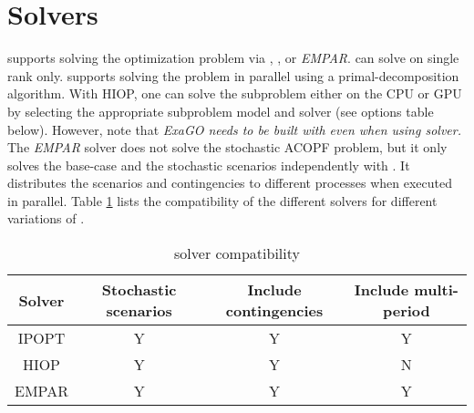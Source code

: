 \section{Solvers}
\sopflow supports solving the optimization problem via \ipopt, \hiop, or \emph{EMPAR}. \ipopt can solve \sopflow on single rank only. \hiop supports solving the problem in parallel using a primal-decomposition algorithm. With HIOP, one can solve the subproblem either on the CPU or GPU by selecting the appropriate subproblem model and solver (see options table below). However, note that \emph{ExaGO needs to be built with \ipopt even when using \hiop solver.} The \emph{EMPAR} solver does not solve the stochastic ACOPF problem, but it only solves the base-case and the stochastic scenarios independently with \opflow. It distributes the scenarios and contingencies to different processes when executed in parallel. Table \ref{tab:sopflow_solvers} lists the compatibility of the different solvers for different variations of \sopflow.

\begin{center}
\begin{table}[!htbp]
    \centering
    \caption{\sopflow solver compatibility}
    \begin{tabular}{|c|c|c|c|}
      \hline
      \textbf{Solver} & \textbf{Stochastic scenarios} & \textbf{Include contingencies} & \textbf{Include multi-period} \\
      \hline
      IPOPT   & Y & Y & Y \\ \hline
      HIOP & Y & Y  & N \\ \hline
      EMPAR  & Y & Y  & Y \\ \hline
    \end{tabular}
    \label{tab:sopflow_solvers}
\end{table}
\end{center}


